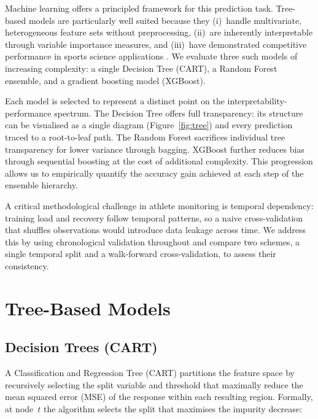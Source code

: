 \documentclass[10pt, twocolumn]{article}
\begin{document}
Machine learning offers a principled framework for this prediction task.
Tree-based models are particularly well suited because they (i)~handle
multivariate, heterogeneous feature sets without preprocessing, (ii)~are
inherently interpretable through variable importance measures, and (iii)~have
demonstrated competitive performance in sports science applications
\citep{lovdal2021}. We evaluate three such models of increasing complexity:
a single Decision Tree (CART), a Random Forest ensemble, and a gradient
boosting model (XGBoost).

Each model is selected to represent a distinct point on the
interpretability-performance spectrum. The Decision Tree offers full
transparency: its structure can be visualised as a single diagram
(Figure~\ref{fig:tree}) and every prediction traced to a root-to-leaf
path. The Random Forest sacrifices individual tree transparency for
lower variance through bagging. XGBoost further reduces bias through
sequential boosting at the cost of additional complexity. This
progression allows us to empirically quantify the accuracy gain
achieved at each step of the ensemble hierarchy.

A critical methodological challenge in athlete monitoring is temporal
dependency: training load and recovery follow temporal patterns, so a naive
cross-validation that shuffles observations would introduce data leakage
across time. We address this by using chronological validation throughout
and compare two schemes, a single temporal split and a walk-forward
cross-validation, to assess their consistency.

\section{Tree-Based Models}
\label{sec:models}

\subsection{Decision Trees (CART)}
\label{subsec:dt}

A Classification and Regression Tree (CART) \citep{breiman1984} partitions
the feature space by recursively selecting the split variable and threshold
that maximally reduce the mean squared error (MSE) of the response within
each resulting region. Formally, at node~$t$ the algorithm selects the
split that maximises the impurity decrease:
\end{document}
